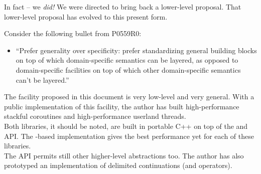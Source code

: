 
In fact -- we \emph{did!}\cite{N3708}\citecomma\cite{N3985} We were directed
to bring back a lower-level proposal. That lower-level proposal has evolved to
this present form.


Consider the following bullet from P0559R0:\cite{P0559R0}

\begin{itemize}
\item ``Prefer generality over specificity: prefer standardizing general
  building blocks on top of which domain-specific semantics can be layered, as
  opposed to domain-specific facilities on top of which other domain-specific
  semantics can't be layered.''
\end{itemize}

The \callcc facility proposed in this document is very low-level and very
general. With a public implementation of this facility,\cite{bcontext} the
author has built high-performance stackful coroutines\cite{bcoroutine2} and
high-performance userland threads\cite{bfiber}.\\

Both libraries, it should be noted, are built in portable C++ on top of the
 and  API. The -based
implementation gives the best performance yet for each of these libraries.\\

The API permits still other higher-level abstractions too. The author has also
prototyped an implementation of delimited continuations (\shift and \reset
operators).
